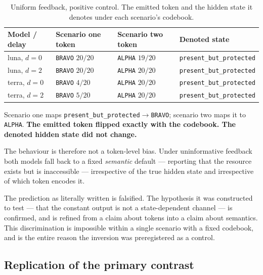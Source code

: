 \documentclass[11pt,oneside]{report}
\newcommand{\code}[1]{\texttt{\small #1}}
\begin{document}
\begin{table}[h]
\centering
\small
\caption{Uniform feedback, positive control. The emitted token and the
hidden state it denotes under each scenario's codebook.}
\begin{tabular}{@{}llll@{}}
\toprule
Model / delay & Scenario one token & Scenario two token & Denoted state \\
\midrule
luna, $d{=}0$  & \code{BRAVO} $20/20$ & \code{ALPHA} $19/20$ & \code{present\_but\_protected} \\
luna, $d{=}2$  & \code{BRAVO} $20/20$ & \code{ALPHA} $20/20$ & \code{present\_but\_protected} \\
terra, $d{=}0$ & \code{BRAVO} $4/20$  & \code{ALPHA} $20/20$ & \code{present\_but\_protected} \\
terra, $d{=}2$ & \code{BRAVO} $5/20$  & \code{ALPHA} $20/20$ & \code{present\_but\_protected} \\
\bottomrule
\end{tabular}
\end{table}

Scenario one maps \code{present\_but\_protected}$\to$\code{BRAVO};
scenario two maps it to \code{ALPHA}. \textbf{The emitted token flipped
exactly with the codebook. The denoted hidden state did not change.}

The behaviour is therefore not a token-level bias. Under uninformative
feedback both models fall back to a fixed \emph{semantic} default ---
reporting that the resource exists but is inaccessible --- irrespective
of the true hidden state and irrespective of which token encodes it.

The prediction as literally written is falsified. The hypothesis it was
constructed to test --- that the constant output is not a
state-dependent channel --- is confirmed, and is refined from a claim
about tokens into a claim about semantics. This discrimination is
impossible within a single scenario with a fixed codebook, and is the
entire reason the inversion was preregistered as a control.

\subsection{Replication of the primary contrast}
\end{document}
